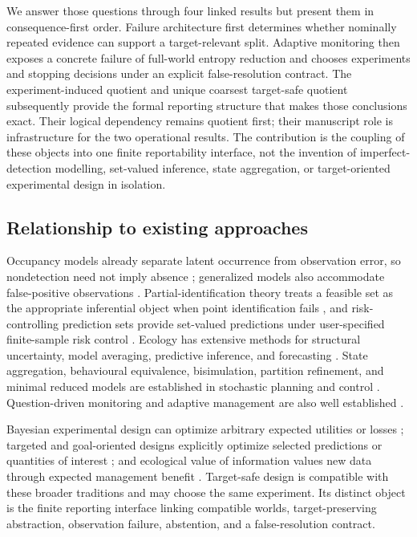 \documentclass[11pt]{article}
\begin{document}
We answer those questions through four linked results but present them in consequence-first order. Failure architecture first determines whether nominally repeated evidence can support a target-relevant split. Adaptive monitoring then exposes a concrete failure of full-world entropy reduction and chooses experiments and stopping decisions under an explicit false-resolution contract. The experiment-induced quotient and unique coarsest target-safe quotient subsequently provide the formal reporting structure that makes those conclusions exact. Their logical dependency remains quotient first; their manuscript role is infrastructure for the two operational results. The contribution is the coupling of these objects into one finite reportability interface, not the invention of imperfect-detection modelling, set-valued inference, state aggregation, or target-oriented experimental design in isolation.

\subsection{Relationship to existing approaches}
Occupancy models already separate latent occurrence from observation error, so nondetection need not imply absence \cite{MacKenzieEtAl2002}; generalized models also accommodate false-positive observations \cite{RoyleLink2006}. Partial-identification theory treats a feasible set as the appropriate inferential object when point identification fails \cite{Manski2003}, and risk-controlling prediction sets provide set-valued predictions under user-specified finite-sample risk control \cite{BatesEtAl2021}. Ecology has extensive methods for structural uncertainty, model averaging, predictive inference, and forecasting \cite{DormannEtAl2018,Dietze2017,DietzeEtAl2018}. State aggregation, behavioural equivalence, bisimulation, partition refinement, and minimal reduced models are established in stochastic planning and control \cite{GivanDeanGreig2003}. Question-driven monitoring and adaptive management are also well established \cite{NicholsWilliams2006,LindenmayerLikens2009,Williams2011}.

Bayesian experimental design can optimize arbitrary expected utilities or losses \cite{ChalonerVerdinelli1995}; targeted and goal-oriented designs explicitly optimize selected predictions or quantities of interest \cite{VanlierEtAl2012,AttiaEtAl2018,ZhongEtAl2026}; and ecological value of information values new data through expected management benefit \cite{CanessaEtAl2015}. Target-safe design is compatible with these broader traditions and may choose the same experiment. Its distinct object is the finite reporting interface linking compatible worlds, target-preserving abstraction, observation failure, abstention, and a false-resolution contract.
\end{document}
